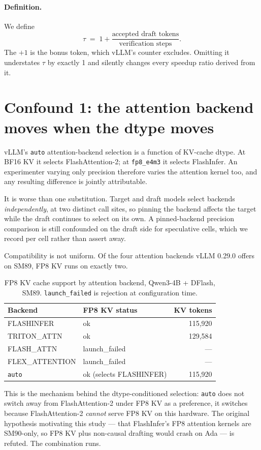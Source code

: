 \documentclass[11pt]{article}
\newcommand{\tw}[1]{\texttt{\small #1}}
\begin{document}
\paragraph{Definition.} We define
\[
\tau \;=\; 1 + \frac{\text{accepted draft tokens}}{\text{verification steps}}.
\]
The $+1$ is the bonus token, which vLLM's counter excludes. Omitting it
understates $\tau$ by exactly 1 and silently changes every speedup ratio
derived from it.

\section{Confound 1: the attention backend moves when the dtype moves}\label{sec:c1}

vLLM's \tw{auto} attention-backend selection is a function of KV-cache
dtype. At BF16 KV it selects FlashAttention-2; at \tw{fp8\_e4m3} it selects
FlashInfer. An experimenter varying only precision therefore varies the
attention kernel too, and any resulting difference is jointly attributable.

It is worse than one substitution. Target and draft models select backends
\emph{independently}, at two distinct call sites, so pinning the backend
affects the target while the draft continues to select on its own. A
pinned-backend precision comparison is still confounded on the draft side
for speculative cells, which we record per cell rather than assert away.

Compatibility is not uniform. Of the four attention backends vLLM 0.29.0
offers on SM89, FP8 KV runs on exactly two.

\begin{table}[h]\centering\small
\caption{FP8 KV cache support by attention backend, Qwen3-4B + DFlash, SM89.
\tw{launch\_failed} is rejection at configuration time.}
\begin{tabular}{llr}
\toprule
Backend & FP8 KV status & KV tokens\\
\midrule
FLASHINFER & ok & 115{,}920\\
TRITON\_ATTN & ok & 129{,}584\\
FLASH\_ATTN & launch\_failed & ---\\
FLEX\_ATTENTION & launch\_failed & ---\\
\tw{auto} & ok (selects FLASHINFER) & 115{,}920\\
\bottomrule
\end{tabular}
\end{table}

\noindent
This is the mechanism behind the dtype-conditioned selection: \tw{auto} does
not switch away from FlashAttention-2 under FP8 KV as a preference, it
switches because FlashAttention-2 \emph{cannot} serve FP8 KV on this
hardware. The original hypothesis motivating this study --- that FlashInfer's
FP8 attention kernels are SM90-only, so FP8 KV plus non-causal drafting
would crash on Ada --- is refuted. The combination runs.
\end{document}
